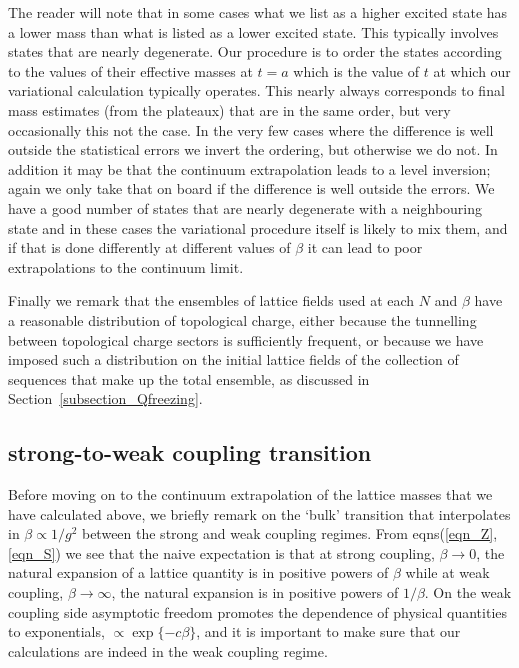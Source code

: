 \documentclass[12pt]{article}
\begin{document}
The reader will note that in some cases what we list as a higher excited state has a lower mass
than what is listed as a lower excited state. This typically involves states that are
nearly degenerate. Our procedure is to order the states according to the values of their
effective masses at $t=a$ which is the value of $t$ at which our variational calculation
typically operates. This nearly always corresponds to final mass estimates (from the plateaux)
that are in the same order, but very occasionally this not the case.
In the very few cases where the difference is well outside the statistical errors
we invert the ordering, but otherwise we do not. In addition it may be that
the continuum extrapolation leads to a level inversion; again we only take that on board
if the difference is well outside the errors. We have a good number of states that are nearly
degenerate with a neighbouring state and in these cases the variational procedure itself is
likely to mix them, and if that is done differently at different values of $\beta$ it can
lead to poor extrapolations to the continuum limit.

Finally we remark that
the ensembles of lattice fields used at each $N$ and $\beta$ have a reasonable distribution
of topological charge, either because the tunnelling between topological charge sectors is
sufficiently frequent, or because we have imposed such a distribution on the initial lattice
fields of the collection of sequences that make up the total ensemble, as discussed in
Section~\ref{subsection_Qfreezing}.


%
%
\subsection{strong-to-weak coupling transition}
\label{subsection_bulk}

Before moving on to the continuum extrapolation of the lattice masses that we have calculated
above, we briefly remark on the `bulk' transition that interpolates in $\beta\propto 1/g^2$
between the strong and weak coupling regimes. From eqns(\ref{eqn_Z},\ref{eqn_S}) we see that the
naive expectation is that at strong coupling, $\beta\to 0$, the natural expansion of a
lattice quantity is in positive powers of $\beta$ while at weak coupling, $\beta\to \infty$, 
the natural expansion is in positive powers of $1/\beta$. On the weak coupling side
asymptotic freedom promotes the dependence of physical quantities to exponentials,
$\propto \exp\{-c\beta\}$, and it is important to make sure that our calculations
are indeed in the weak coupling regime.
\end{document}
